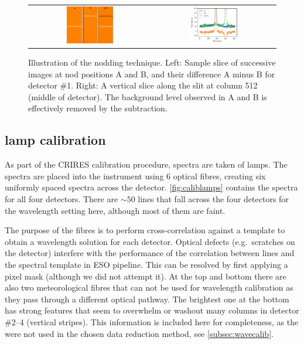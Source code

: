 \begin{figure}
    \centering
    \begin{tabular}{cc}    %
       \includegraphics[width=0.4\textwidth]{figures/reduction/Nods_AB_A-B_labelled.png} & \includegraphics[width=0.42\textwidth]{figures/reduction/nod_slice_example.pdf} \\
    \end{tabular}
    \caption{Illustration of the nodding technique.
        Left: Sample slice of successive images at nod positions A and B, and their difference A minus B for detector \#1.
        Right: A vertical slice along the slit at column 512 (middle of detector).
        The background level observed in A and B is effectively removed by the subtraction.}
    \label{fig:nodimages}
\end{figure}

\subsection{\thar{} lamp calibration}
\label{subsec:th-ar}
As part of the {CRIRES} calibration procedure, spectra are taken of \thar{} lamps.
The \thar{} spectra are placed into the instrument using 6 optical fibres, creating six uniformly spaced spectra across the detector.
\cref{fig:caliblamps} contains the \thar{} spectra for all four detectors.
There are \(\sim50\) \thar{} lines that fall across the four detectors for the wavelength setting here, although most of them are faint.

The purpose of the \thar{} fibres is to perform cross-correlation against a \thar{} template to obtain a wavelength solution for each detector.
Optical defects (e.g.\ scratches on the detector) interfere with the performance of the correlation between \thar{} lines and the spectral template in {ESO} pipeline.
This can be resolved by first applying a pixel mask (although we did not attempt it).
At the top and bottom there are also two meteorological fibres that can not be used for wavelength calibration as they pass through a different optical pathway.
The brightest one at the bottom has strong features that seem to overwhelm or washout many columns in detector \#2--4 (vertical stripes).
This information is included here for completeness, as the \thar{} were not used in the chosen data reduction method, see \cref{subsec:wavecalib}.

